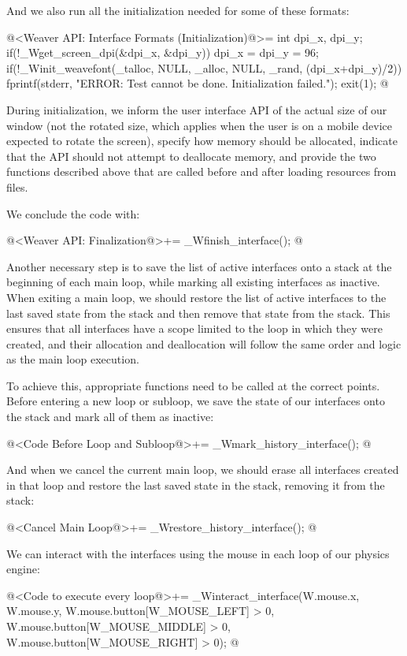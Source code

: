 And we also run all the initialization needed for some of these
formats:

@<Weaver API: Interface Formats (Initialization)@>=
{
  int dpi_x, dpi_y;
  if(!_Wget_screen_dpi(&dpi_x, &dpi_y)){
    dpi_x = dpi_y = 96;
  }
  if(!_Winit_weavefont(_talloc, NULL, _alloc, NULL, _rand, (dpi_x+dpi_y)/2)){
    fprintf(stderr, "ERROR: Test cannot be done. Initialization failed.\n");
    exit(1);
  }
}
@

During initialization, we inform the user interface API of the actual
size of our window (not the rotated size, which applies when the user
is on a mobile device expected to rotate the screen), specify how
memory should be allocated, indicate that the API should not attempt
to deallocate memory, and provide the two functions described above
that are called before and after loading resources from files.

We conclude the code with:

\iniciocodigo
@<Weaver API: Finalization@>+=
_Wfinish_interface();
@
\fimcodigo

Another necessary step is to save the list of active interfaces onto a
stack at the beginning of each main loop, while marking all existing
interfaces as inactive. When exiting a main loop, we should restore
the list of active interfaces to the last saved state from the stack
and then remove that state from the stack. This ensures that all
interfaces have a scope limited to the loop in which they were
created, and their allocation and deallocation will follow the same
order and logic as the main loop execution.

To achieve this, appropriate functions need to be called at the
correct points. Before entering a new loop or subloop, we save the
state of our interfaces onto the stack and mark all of them as
inactive:

\iniciocodigo
@<Code Before Loop and Subloop@>+=
_Wmark_history_interface();
@
\fimcodigo

And when we cancel the current main loop, we should erase all
interfaces created in that loop and restore the last saved state in
the stack, removing it from the stack:

\iniciocodigo
@<Cancel Main Loop@>+=
_Wrestore_history_interface();
@
\fimcodigo

We can interact with the interfaces using the mouse in each loop of
our physics engine:

\iniciocodigo
@<Code to execute every loop@>+=
_Winteract_interface(W.mouse.x, W.mouse.y,
                     W.mouse.button[W_MOUSE_LEFT] > 0,
                     W.mouse.button[W_MOUSE_MIDDLE] > 0,
                     W.mouse.button[W_MOUSE_RIGHT] > 0);
@
\fimcodigo

